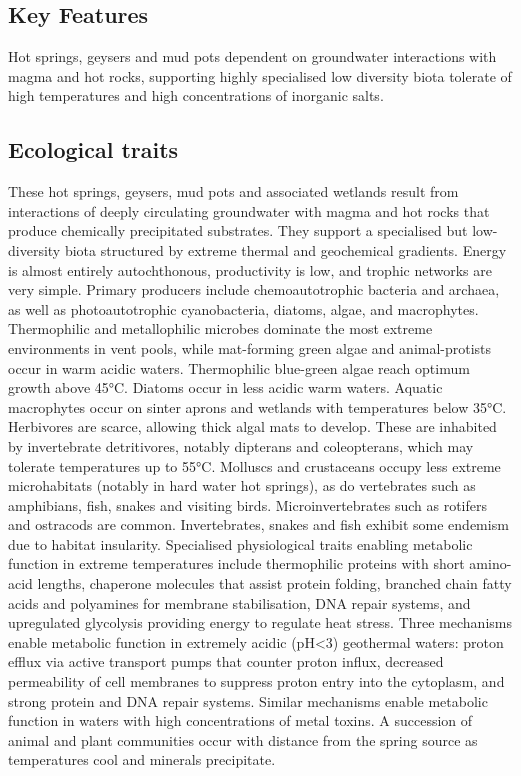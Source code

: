 \documentclass[
  letterpaper,
  DIV=11,
  numbers=noendperiod]{scrartcl}
\begin{document}
\subsection{Key Features}\label{key-features-125}

Hot springs, geysers and mud pots dependent on groundwater interactions
with magma and hot rocks, supporting highly specialised low diversity
biota tolerate of high temperatures and high concentrations of inorganic
salts.

\subsection{Ecological traits}\label{ecological-traits-125}

These hot springs, geysers, mud pots and associated wetlands result from
interactions of deeply circulating groundwater with magma and hot rocks
that produce chemically precipitated substrates. They support a
specialised but low-diversity biota structured by extreme thermal and
geochemical gradients. Energy is almost entirely autochthonous,
productivity is low, and trophic networks are very simple. Primary
producers include chemoautotrophic bacteria and archaea, as well as
photoautotrophic cyanobacteria, diatoms, algae, and macrophytes.
Thermophilic and metallophilic microbes dominate the most extreme
environments in vent pools, while mat-forming green algae and
animal-protists occur in warm acidic waters. Thermophilic blue-green
algae reach optimum growth above 45°C. Diatoms occur in less acidic warm
waters. Aquatic macrophytes occur on sinter aprons and wetlands with
temperatures below 35°C. Herbivores are scarce, allowing thick algal
mats to develop. These are inhabited by invertebrate detritivores,
notably dipterans and coleopterans, which may tolerate temperatures up
to 55°C. Molluscs and crustaceans occupy less extreme microhabitats
(notably in hard water hot springs), as do vertebrates such as
amphibians, fish, snakes and visiting birds. Microinvertebrates such as
rotifers and ostracods are common. Invertebrates, snakes and fish
exhibit some endemism due to habitat insularity. Specialised
physiological traits enabling metabolic function in extreme temperatures
include thermophilic proteins with short amino-acid lengths, chaperone
molecules that assist protein folding, branched chain fatty acids and
polyamines for membrane stabilisation, DNA repair systems, and
upregulated glycolysis providing energy to regulate heat stress. Three
mechanisms enable metabolic function in extremely acidic (pH\textless3)
geothermal waters: proton efflux via active transport pumps that counter
proton influx, decreased permeability of cell membranes to suppress
proton entry into the cytoplasm, and strong protein and DNA repair
systems. Similar mechanisms enable metabolic function in waters with
high concentrations of metal toxins. A succession of animal and plant
communities occur with distance from the spring source as temperatures
cool and minerals precipitate.
\end{document}
